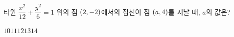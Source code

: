 타원 $\dfrac{x^2}{12}+\dfrac{y^2}{6}=1$ 위의 점 $(2{,}\mkern3mu\mathopen{}-2)$에서의 접선이 점 $(a{,}\mkern3mu\mathopen{}4)$를 지날 때, $a$의 값은?
\begin{choices32}{$10$}{$11$}{$12$}{$13$}{$14$}\end{choices32}
